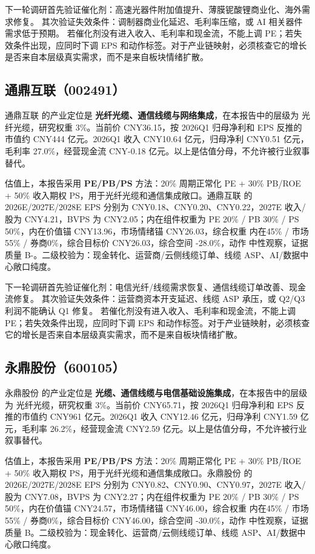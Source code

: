 下一轮调研首先验证催化剂：高速光器件附加值提升、薄膜铌酸锂商业化、海外需求修复。 其次验证失效条件：调制器商业化延迟、毛利率压缩，或 AI 相关器件需求低于预期。 若催化剂没有进入收入、毛利率和现金流，不能上调 PE；若失效条件出现，应同时下调 EPS 和动作标签。对于产业链映射，必须核查它的增长是否来自本层级真实需求，而不是来自板块情绪扩散。


\subsection{通鼎互联（002491）}
通鼎互联 的产业定位是 \textbf{光纤光缆、通信线缆与网络集成}，在本报告中的层级为 光纤光缆，研究权重 3\%。当前价 CNY36.15，按 2026Q1 归母净利和 EPS 反推的市值约 CNY444 亿元。2026Q1 收入 CNY10.64 亿元，归母净利 CNY0.51 亿元，毛利率 27.0\%，经营现金流 CNY-0.18 亿元。以上是估值分母，不允许被行业叙事替代。

估值上，本报告采用 \textbf{PE/PB/PS} 方法：20\% 周期正常化 PE + 30\% PB/ROE + 50\% 收入期权 PS，用于光纤光缆和通信集成敞口。通鼎互联 的 2026E/2027E/2028E EPS 分别为 CNY0.18、CNY0.20、CNY0.22，2027E 收入/股为 CNY4.21，BVPS 为 CNY2.05；内在组件权重为 PE 20\% / PB 30\% / PS 50\%，内在价值锚 CNY13.96，市场情绪锚 CNY26.03，综合权重 内在45\% / 市场55\% / 券商0\%，综合目标价 CNY26.03，综合空间 -28.0\%，动作 中性观察，证据质量 B-。二级校验为：现金转化、运营商/云侧线缆订单、线缆 ASP、AI/数据中心敞口纯度。

下一轮调研首先验证催化剂：电信光纤/线缆需求恢复、通信线缆订单改善、现金流修复。 其次验证失效条件：运营商资本开支延迟、线缆 ASP 承压，或 Q2/Q3 利润不能确认 Q1 修复。 若催化剂没有进入收入、毛利率和现金流，不能上调 PE；若失效条件出现，应同时下调 EPS 和动作标签。对于产业链映射，必须核查它的增长是否来自本层级真实需求，而不是来自板块情绪扩散。


\subsection{永鼎股份（600105）}
永鼎股份 的产业定位是 \textbf{光缆、通信线缆与电信基础设施集成}，在本报告中的层级为 光纤光缆，研究权重 3\%。当前价 CNY65.71，按 2026Q1 归母净利和 EPS 反推的市值约 CNY961 亿元。2026Q1 收入 CNY12.46 亿元，归母净利 CNY1.59 亿元，毛利率 26.2\%，经营现金流 CNY2.59 亿元。以上是估值分母，不允许被行业叙事替代。

估值上，本报告采用 \textbf{PE/PB/PS} 方法：20\% 周期正常化 PE + 30\% PB/ROE + 50\% 收入期权 PS，用于光纤光缆和通信集成敞口。永鼎股份 的 2026E/2027E/2028E EPS 分别为 CNY0.82、CNY0.90、CNY0.97，2027E 收入/股为 CNY7.08，BVPS 为 CNY2.27；内在组件权重为 PE 20\% / PB 30\% / PS 50\%，内在价值锚 CNY24.57，市场情绪锚 CNY46.00，综合权重 内在45\% / 市场55\% / 券商0\%，综合目标价 CNY46.00，综合空间 -30.0\%，动作 中性观察，证据质量 B。二级校验为：现金转化、运营商/云侧线缆订单、线缆 ASP、AI/数据中心敞口纯度。

